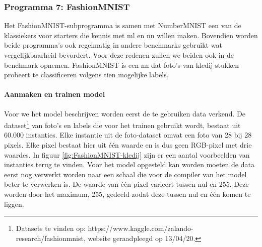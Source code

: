 		\subsubsection{Programma 7: FashionMNIST} \label{prg:FashionMNIST}
		Het FashionMNIST-subprogramma is samen met NumberMNIST een van de klassiekers voor starters die kennis met \gls{ml} en \gls{nn} willen maken. Bovendien worden beide programma's ook regelmatig in andere benchmarks gebruikt wat vergelijkbaarheid bevordert. Voor deze redenen zullen we beiden ook in de benchmark opnemen. FashionMNIST is een \gls{nn} dat foto's van kledij-stukken probeert te classificeren volgens tien mogelijke labels. 
		
			\paragraph{Aanmaken en trainen model}
			Voor we het model beschrijven worden eerst de te gebruiken data verkend. De dataset\footnote{Datasets te vinden op: https://www.kaggle.com/zalando-research/fashionmnist, website geraadpleegd op 13/04/20.} van foto's en labels die voor het trainen gebruikt wordt, bestaat uit 60.000 instanties. Elke instantie uit de foto-dataset omvat een foto van 28 bij 28 pixels. Elke pixel bestaat hier uit \'e\'en waarde en is dus geen RGB-pixel met drie waardes. In figuur \ref{fig:FashionMNIST-kledij} zijn er een aantal voorbeelden van instanties terug te vinden. Voor het model opgesteld kan worden moeten de data eerst nog verwerkt worden naar een schaal die voor de compiler van het model beter te verwerken is. De waarde van \'e\'en pixel varieert tussen nul en 255. Deze worden door het maximum, 255, gedeeld zodat deze tussen nul en \'e\'en komen te liggen. \\
